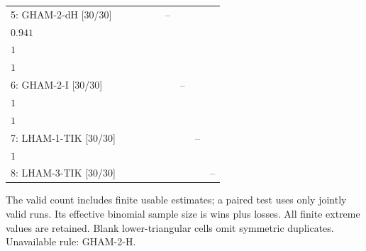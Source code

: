 \begin{table}[!htbp]
{\begin{tabular}{@{}l*{8}{c}@{}}
5: GHAM-2-dH [30/30] &  &  &  &  & -- & \shortstack{$9{:}21{:}0$\\$0.941$} & \shortstack{$11{:}19{:}0$\\$1$} & \shortstack{$12{:}18{:}0$\\$1$} \\
6: GHAM-2-I [30/30] &  &  &  &  &  & -- & \shortstack{$16{:}14{:}0$\\$1$} & \shortstack{$19{:}11{:}0$\\$1$} \\
7: LHAM-1-TIK [30/30] &  &  &  &  &  &  & -- & \shortstack{$19{:}11{:}0$\\$1$} \\
8: LHAM-3-TIK [30/30] &  &  &  &  &  &  &  & -- \\
\bottomrule
\end{tabular}%
}
\endgroup
\par\smallskip
\begin{minipage}{\linewidth}\footnotesize
The valid count includes finite usable estimates; a paired test uses only jointly valid runs. Its effective binomial sample size is wins plus losses. All finite extreme values are retained. Blank lower-triangular cells omit symmetric duplicates.
Unavailable rule: GHAM-2-H.
\end{minipage}
\end{table}

